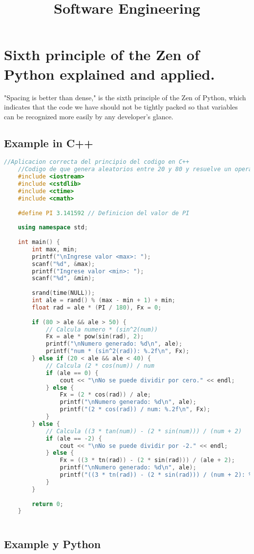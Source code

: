 \documentclass[a4,10pt]{article}
\title{Software Engineering}
\begin{document}
\section{Sixth principle of the Zen of Python explained and applied.}


"Spacing is better than dense," is the sixth principle of the Zen of Python, which indicates that the code we have should not be tightly packed so that variables can be recognized more easily by any developer's glance. 

\subsection{Example in C++}
\begin{lstlisting}[language=C++,linewidth=12cm,basicstyle=\footnotesize]
	//Aplicacion correcta del principio del codigo en C++
	//Codigo de que genera aleatorios entre 20 y 80 y resuelve un operacion
	#include <iostream>
	#include <cstdlib>
	#include <ctime>
	#include <cmath>
	
	#define PI 3.141592 // Definicion del valor de PI
	
	using namespace std;
	
	int main() {
		int max, min;
		printf("\nIngrese valor <max>: ");
		scanf("%d", &max);
		printf("Ingrese valor <min>: ");
		scanf("%d", &min);
		
		srand(time(NULL));
		int ale = rand() % (max - min + 1) + min;
		float rad = ale * (PI / 180), Fx = 0;
		
		if (80 > ale && ale > 50) {
			// Calcula numero * (sin^2(num))
			Fx = ale * pow(sin(rad), 2);
			printf("\nNumero generado: %d\n", ale);
			printf("num * (sin^2(rad)): %.2f\n", Fx);
		} else if (20 < ale && ale < 40) {
			// Calcula (2 * cos(num)) / num
			if (ale == 0) {
				cout << "\nNo se puede dividir por cero." << endl;
			} else {
				Fx = (2 * cos(rad)) / ale;
				printf("\nNumero generado: %d\n", ale);
				printf("(2 * cos(rad)) / num: %.2f\n", Fx);
			}
		} else {
			// Calcula ((3 * tan(num)) - (2 * sin(num))) / (num + 2)
			if (ale == -2) {
				cout << "\nNo se puede dividir por -2." << endl;
			} else {
				Fx = ((3 * tn(rad)) - (2 * sin(rad))) / (ale + 2);
				printf("\nNumero generado: %d\n", ale);
				printf("((3 * tn(rad)) - (2 * sin(rad))) / (num + 2): %.2f\n", Fx);
			}
		}
		
		return 0;
	}
	
\end{lstlisting}

\subsection{Example y Python}
\end{document}
